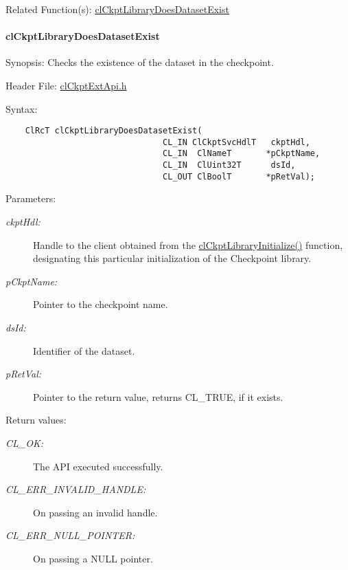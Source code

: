 \begin{Desc}
\item[Related Function(s):]\hyperlink{group__group10}{cl\-Ckpt\-Library\-Does\-Dataset\-Exist} \end{Desc}
\hypertarget{pageckpt210}{}\paragraph{cl\-Ckpt\-Library\-Does\-Dataset\-Exist}\label{pageckpt210}
\begin{Desc}
\item[Synopsis:]Checks the existence of the dataset in the checkpoint.\end{Desc}
\begin{Desc}
\item[Header File:]\hyperlink{cl_ckpt_ext_api_8h}{cl\-Ckpt\-Ext\-Api.h}\end{Desc}
\begin{Desc}
\item[Syntax:]

\footnotesize\begin{verbatim}    ClRcT clCkptLibraryDoesDatasetExist(
                                CL_IN ClCkptSvcHdlT   ckptHdl,
                                CL_IN  ClNameT       *pCkptName,
                                CL_IN  ClUint32T      dsId,
                                CL_OUT ClBoolT       *pRetVal);
\end{verbatim}
\normalsize
\end{Desc}
\begin{Desc}
\item[Parameters:]
\begin{description}
\item[{\em ckpt\-Hdl:}]Handle to the client obtained from the \hyperlink{group__group10_ga2}{cl\-Ckpt\-Library\-Initialize()} function, designating this particular initialization of the Checkpoint library. \item[{\em p\-Ckpt\-Name:}]Pointer to the checkpoint name. \item[{\em ds\-Id:}]Identifier of the dataset. \item[{\em p\-Ret\-Val:}]Pointer to the return value, returns CL\_\-TRUE, if it exists.\end{description}
\end{Desc}
\begin{Desc}
\item[Return values:]
\begin{description}
\item[{\em CL\_\-OK:}]The API executed successfully. \item[{\em CL\_\-ERR\_\-INVALID\_\-HANDLE:}]On passing an invalid handle. \item[{\em CL\_\-ERR\_\-NULL\_\-POINTER:}]On passing a NULL pointer.\end{description}
\end{Desc}
